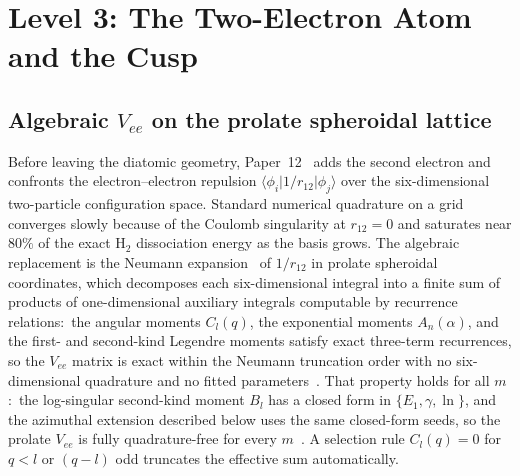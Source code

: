\documentclass[aps,pra,twocolumn,superscriptaddress,longbibliography]{revtex4-2}
\begin{document}
\section{Level 3: The Two-Electron Atom and the Cusp}
\label{sec:level3}

\subsection{Algebraic $V_{ee}$ on the prolate spheroidal lattice}

Before leaving the diatomic geometry, Paper~12~\cite{loutey_paper12}
adds the second electron and confronts the electron--electron
repulsion $\langle \phi_i | 1/r_{12} | \phi_j \rangle$ over the
six-dimensional two-particle configuration space.  Standard numerical
quadrature on a grid converges slowly because of the Coulomb
singularity at $r_{12} = 0$ and saturates near $80\%$ of the exact
$\mathrm{H}_2$ dissociation energy as the basis grows.  The
algebraic replacement is the Neumann expansion~\cite{neumann1878} of $1/r_{12}$ in prolate
spheroidal coordinates, which decomposes each six-dimensional integral
into a finite sum of products of one-dimensional auxiliary integrals
computable by recurrence relations:\ the angular moments $C_l(q)$, the
exponential moments $A_n(\alpha)$, and the first- and second-kind
Legendre moments satisfy exact three-term recurrences, so the
$V_{ee}$ matrix is exact within the Neumann truncation order with no
six-dimensional quadrature and no fitted parameters~\cite{loutey_paper12}.
That property holds for all $m$:\ the log-singular second-kind moment
$B_l$ has a
closed form in $\{E_1, \gamma, \ln\}$, and the azimuthal extension
described below uses the same closed-form seeds, so the prolate
$V_{ee}$ is fully quadrature-free for every $m$~\cite{loutey_paper12}.  A
selection rule $C_l(q) = 0$ for $q < l$ or $(q-l)$ odd truncates the
effective sum automatically.
\end{document}
